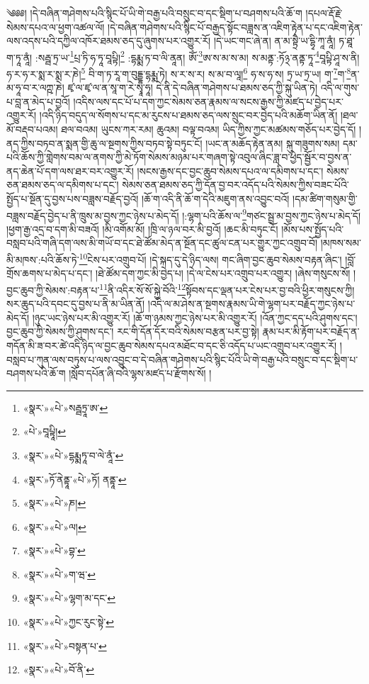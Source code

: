 ༄༅༅། །དེ་བཞིན་གཤེགས་པའི་སྙིང་པོ་ཡི་གེ་བརྒྱ་པའི་བསྲུང་བ་དང་སྡིག་པ་བཤགས་པའི་ཆོ་ག །དཔལ་རྡོ་རྗེ་སེམས་དཔའ་ལ་ཕྱག་འཚལ་ལོ། །དེ་བཞིན་གཤེགས་པའི་སྙིང་པོ་བརྒྱད་སྟོང་བཟླས་ན་འཇིག་རྟེན་པ་དང་འཇིག་རྟེན་ལས་འདས་པའི་དཀྱིལ་འཁོར་ཐམས་ཅད་དུ་ཞུགས་པར་འགྱུར་རོ། །དེ་ཡང་གང་ཞེ་ན། ན་མ་སྟྲཻ་ཡ་དྷྭི་ཀཱ་ནཱཾ། ཏ་ཐཱ་ག་ཏཱ་ནཱཾ། :སརྦྦ་ཏྲ་ཡ་\footnote{«སྣར་»«པེ་»སརྦྦཏྲཱ་ཨ་}པྲ་ཏི་ཧ་ཏཱ་བཱཔྟི།\footnote{«པེ་»བཱཔྟཱི།} :དྷརྨྨ་ཏ་བ་ལི་ནཱན། ཨོཾ་\footnote{«སྣར་»«པེ་»དྷརྨྨཏཱ་བ་ལེ་ནཱཾ་}ཨ་ས་མ་ས་མ། ས་མནྟ་:ཏོ྅་ནནྟ་ཏཱ་\footnote{«སྣར་»ཏོ་ནེནྟཱ་«པེ་»ཏོ། ནནྟཱ་}བཱཔྟི་ཤཱ་ས་ནི། ཧ་ར་ཧ་ར་སྨ་ར་སྨ་ར་ཎེ།\footnote{«སྣར་»«པེ་»ཎ།} བི་ག་ཏ་རཱ་ག་བུདྡྷ་དྷརྨྨ་ཏེ། ས་ར་ས་ར། ས་མ་བ་ལཱ།\footnote{«སྣར་»«པེ་»ལ།} ཧ་ས་ཧ་ས། ཏྲ་ཡ་ཏྲ་ཡ། ག་\footnote{«སྣར་»«པེ་»བྷ་}ག་\footnote{«སྣར་»«པེ་»ག་ཝ་}ན་མ་ཧཱ་བ་ར་ལཀྵ་ཎེ། ཛྭ་ལ་ཛྭ་ལ་ན་སཱ་ག་རེ་སྭཱ་ཧཱ། དེ་ནི་དེ་བཞིན་གཤེགས་པ་ཐམས་ཅད་ཀྱི་སྐུ་ཡིན་ཏེ། འདི་ལ་གུས་པ་བླ་ན་མེད་པ་བྱའོ། །འདིས་ལས་དང་པོ་པ་དག་ཀྱང་སེམས་ཅན་རྣམས་ལ་སངས་རྒྱས་ཀྱི་མཛད་པ་བྱེད་པར་འགྱུར་རོ། །འདི་ཉིད་བདུད་ལ་སོགས་པ་དང་མ་རུངས་པ་ཐམས་ཅད་ལས་སྲུང་བར་བྱེད་པའི་མཆོག་ཡིན་ནོ། །ཐལ་མོ་བརྡབ་པའམ། ཐལ་བའམ། ཡུངས་ཀར་རམ། ཆུའམ། བལྟ་བའམ། ཡིད་ཀྱིས་ཀྱང་མཚམས་གཅོད་པར་བྱེད་དོ། །ནད་ཀྱིས་བཏབ་ན་སྨན་གྱི་ཆུ་ལ་སྔགས་ཀྱིས་བཏབ་སྟེ་བཏུང་ངོ། །ཡང་ན་མཆོད་རྟེན་ནམ། སྐུ་གཟུགས་སམ། དམ་པའི་ཆོས་ཀྱི་གླེགས་བམ་ལ་ནགས་ཀྱི་མེ་ཏོག་སེམས་མཉམ་པར་གཞག་སྟེ་འབུལ་ཞིང་ཟླ་བ་ཕྱེད་སྦྱོར་བ་བྱས་ན་ནད་ཆེན་པོ་དག་ལས་ཐར་བར་འགྱུར་རོ། །སངས་རྒྱས་དང་བྱང་ཆུབ་སེམས་དཔའ་ལ་དམིགས་པ་དང་། སེམས་ཅན་ཐམས་ཅད་ལ་དམིགས་པ་དང་། སེམས་ཅན་ཐམས་ཅད་ཀྱི་དོན་བྱ་བར་འདོད་པའི་སེམས་ཀྱིས་བཟང་པོའི་སྤྱོད་པ་སྔོན་དུ་བྱས་པས་བཟླས་བརྗོད་བྱའོ། །ཆོ་ག་འདི་ནི་ཆོ་ག་དེའི་མཇུག་ནས་འབྱུང་བའོ། །དམ་ཚིག་གསུམ་གྱི་བཟླས་བརྗོད་བྱེད་པ་ནི་ཁྲུས་མ་བྱས་ཀྱང་ཉེས་པ་མེད་དོ། །:ལྷག་པའི་ཆོས་ལ་\footnote{«སྣར་»«པེ་»ལྷག་མ་དང་}གཙང་སྦྲ་མ་བྱས་ཀྱང་ཉེས་པ་མེད་དོ། །ཕྱག་རྒྱ་འདྲ་བ་དག་མི་བཟའོ། །མི་འགོམ་མོ། །ཁྲི་ལ་ཉལ་བར་མི་བྱའོ། །ཆང་མི་བཏུང་ངོ། །མོས་པས་སྤྱོད་པའི་བསླབ་པའི་གཞི་དག་ལས་མི་གཡོ་བ་དང་ཐེ་ཚོམ་མེད་ན་སྔོན་དང་ཚུལ་ངན་པར་གྱུར་ཀྱང་འགྲུབ་བོ། །མཁས་སམ་མི་མཁས་:པའི་ཆོས་ཏེ་\footnote{«སྣར་»«པེ་»ཀྱང་རུང་སྟེ་}ངེས་པར་འགྲུབ་པོ། །དེ་སྐད་དུ་དེ་ཉིད་ལས། གང་ཞིག་བྱང་ཆུབ་སེམས་བརྟན་ཞིང་། །བློ་གྲོས་ཆགས་པ་མེད་པ་དང་། །ཐེ་ཚོམ་དག་ཀྱང་མི་བྱེད་པ། །དེ་ལ་ངེས་པར་འགྲུབ་པར་འགྱུར། །ཞེས་གསུངས་སོ། །བྱང་ཆུབ་ཀྱི་སེམས་:བརྟན་པ་\footnote{«སྣར་»«པེ་»བསྟན་པ་}ནི་འདིར་སོ་སོ་སྐྱེ་བོའི་\footnote{«སྣར་»«པེ་»བོ་ནི་}སྟོབས་དང་ལྡན་པར་ངེས་པར་བྱ་བའི་ཕྱིར་གསུངས་ཀྱི། སར་ཆུད་པའི་དབང་དུ་བྱས་པ་ནི་མ་ཡིན་ནོ། །འདི་ལ་མ་ཤེས་ན་སྔགས་རྣམས་ཡི་གེ་ལྷག་པར་བརྗོད་ཀྱང་ཉེས་པ་མེད་དོ། །ཉུང་ཡང་ཉེས་པར་མི་འགྱུར་རོ། །ཆོ་ག་ཉམས་ཀྱང་ཉེས་པར་མི་འགྱུར་རོ། །འོན་ཀྱང་དད་པའི་ཤུགས་དང་། བྱང་ཆུབ་ཀྱི་སེམས་ཀྱི་ཤུགས་དང་། རང་གི་དོན་དོར་བའི་སེམས་བརྩན་པར་བྱ་སྟེ། རྣམ་པར་མི་རྟོག་པར་བརྗོད་ན་གདོན་མི་ཟ་བར་ཚེ་འདི་ཉིད་ལ་བྱང་ཆུབ་སེམས་དཔའ་མཐོང་བ་དང་ཅི་འདོད་པ་ཡང་འགྲུབ་པར་འགྱུར་རོ། །བསླབ་པ་ཀུན་ལས་བཏུས་པ་ལས་འབྱུང་བ་དེ་བཞིན་གཤེགས་པའི་སྙིང་པོའི་ཡི་གེ་བརྒྱ་པའི་བསྲུང་བ་དང་སྡིག་པ་བཤགས་པའི་ཆོ་ག །སློབ་དཔོན་ཞི་བའི་ལྷས་མཛད་པ་རྫོགས་སོ། ། 